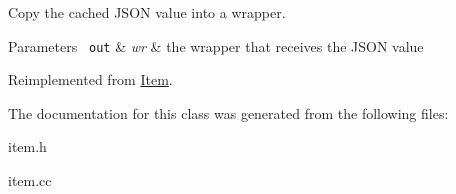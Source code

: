 Copy the cached J\+S\+ON value into a wrapper. 
\begin{DoxyParams}[1]{Parameters}
\mbox{\texttt{ out}}  & {\em wr} & the wrapper that receives the J\+S\+ON value \\
\hline
\end{DoxyParams}


Reimplemented from \mbox{\hyperlink{classItem_a57e763fcde2d0a819d21e31c59611290}{Item}}.



The documentation for this class was generated from the following files\+:\begin{DoxyCompactItemize}
\item 
item.\+h\item 
item.\+cc\end{DoxyCompactItemize}
